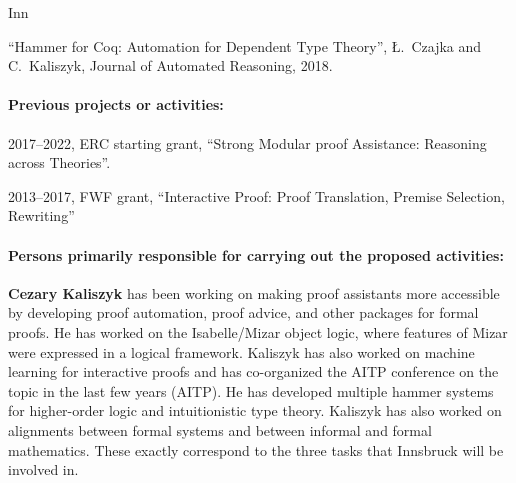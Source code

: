 \begin{sitedescription}{Inn}
\begin{compactitem}
\item ``Hammer for Coq: Automation for Dependent Type Theory'', Ł.~Czajka and C.~Kaliszyk, Journal of Automated Reasoning, 2018.
\end{compactitem}

\paragraph*{Previous projects or activities:}

\begin{compactitem}
\item 2017--2022, ERC starting grant, ``Strong Modular proof Assistance: Reasoning across Theories''.
\item 2013--2017, FWF grant, ``Interactive Proof: Proof Translation, Premise Selection, Rewriting''
\end{compactitem}




\paragraph*{Persons primarily responsible for carrying out the proposed activities:}

\begin{compactitem}
\item \textbf{Cezary Kaliszyk} has been working on making proof assistants
more accessible by developing proof automation, proof advice, and other packages for formal
proofs. He has worked on the Isabelle/Mizar object logic, where features of Mizar were
expressed in a logical framework. Kaliszyk has also worked on machine learning for interactive
proofs and has co-organized the AITP conference on the topic in the last few years (AITP). He
has developed multiple hammer systems for higher-order logic and intuitionistic type theory.
Kaliszyk has also worked on alignments between formal systems and between informal and formal
mathematics. These exactly correspond to the three tasks that Innsbruck will be involved in.
\end{compactitem}



\end{sitedescription}
